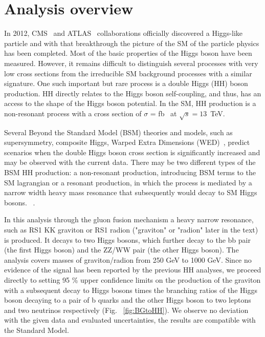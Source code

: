 \chapter{Analysis overview}
\label{ch:an_overview}

In 2012, CMS~\cite{HiggsCMS} and
ATLAS~\cite{HiggsAtlas} collaborations officially discovered a Higgs-like particle and with that breakthrough the picture of the
SM \cite{Salam:1961en,Glashow:1961tr,Weinberg:1967tq}
of the particle physics has been completed. 
Most of the basic properties of the Higgs
boson have been measured. 
However, it remains difficult to distinguish several processes with very low
cross sections from the
irreducible SM background processes with a similar signature. 
One such important but rare process is a double Higgs (HH) boson
production. HH directly relates to the Higgs boson self-coupling, and thus,  
has an access to the shape of the Higgs boson potential. In the SM, HH
production is a non-resonant process with a cross section of $\sigma$
=  fb~\cite{HHXsec} at $\sqrt{s}=13$~TeV. 

Several Beyond the Standard
Model (BSM) theories and models, such as supersymmetry, composite Higgs, Warped Extra Dimensions (WED)~\cite{Dolan:2012ac, Huang:2017nnw, Kanemura:2016tan, Oliveira:2014kla, WED}, predict scenarios when the double Higgs boson
cross section is significantly increased and may be observed with the current data.
There may be two different types of the BSM HH production: a non-resonant production,
introducing BSM terms to the SM lagrangian or a resonant production,
in which the process is mediated by a narrow width heavy mass resonance that subsequently would decay to SM Higgs bosons. 
~\cite{WED}. %
\vspace{1em} %


In this analysis through the gluon fusion mechanism a heavy narrow
resonance, such as RS1 KK graviton or RS1 radion ("graviton" or "radion" later in the text) \cite{BG1,BG2,BG3} is produced. It decays to two Higgs bosons, which further decay to the bb pair (the first Higgs boson) and the ZZ/WW pair (the other Higgs boson). 
The analysis covers masses of graviton/radion from 250 GeV to 1000 GeV. Since no evidence of the signal has been reported by the previous HH analyses, we proceed directly to setting 95 \% upper confidence
limits on the production of the graviton with a subsequent
decay to Higgs bosons times the branching ratios of the Higgs
boson decaying to a pair of b quarks and the other Higgs boson to two
leptons and two neutrinos respectively (Fig. ~\ref{fig:BGtoHH}). We observe no deviation with the given data and
evaluated uncertainties, the results are compatible with the Standard
Model.


